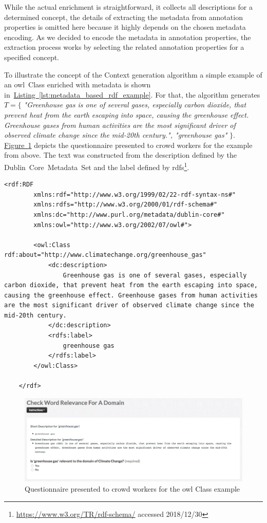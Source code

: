 While the actual enrichment is straightforward, it collects all descriptions for a determined concept, the details of extracting the metadata from annotation properties is omitted here because it highly depends on the chosen metadata encoding.
As we decided to encode the metadata in annotation properties, the extraction process works by selecting the related annotation properties for a specified concept. 

To illustrate the concept of the Context generation algorithm a simple example of an \gls{owl}~Class enriched with metadata is shown in~\hyperref[lst:metadata_based_rdf_example]{Listing~\ref*{lst:metadata_based_rdf_example}}.
For that, the algorithm generates $T=\{$ \emph{"Greenhouse gas is one of several gases, especially carbon dioxide, that prevent heat from the earth escaping into space, causing the greenhouse effect. Greenhouse gases from human activities are the most significant driver of observed climate change since the mid-20th century.", "greenhouse gas"} $\}$. 
\hyperref[fig:metadata_rdf_example_questionaire]{Figure~\ref*{fig:metadata_rdf_example_questionaire}} depicts the questionnaire presented to crowd workers for the example from above. The text was constructed from the description defined by the Dublin~Core~Metadata~Set and the label defined by \gls{rdfs}\footnote{\url{https://www.w3.org/TR/rdf-schema/} accessed 2018/12/30}. 

\begin{lstlisting}[frame=single,breaklines=true,postbreak=\mbox{\textcolor{black}{$\hookrightarrow$}\space},caption=An \gls{owl} Class enriched with metadata,label=lst:metadata_based_rdf_example]
	<rdf:RDF
		xmlns:rdf="http://www.w3.org/1999/02/22-rdf-syntax-ns#"
		xmlns:rdfs="http://www.w3.org/2000/01/rdf-schema#"
		xmlns:dc="http://www.purl.org/metadata/dublin-core#"
		xmlns:owl="http://www.w3.org/2002/07/owl#">
		
		<owl:Class rdf:about="http://www.climatechange.org/greenhouse_gas"
			<dc:description>
				Greenhouse gas is one of several gases, especially carbon dioxide, that prevent heat from the earth escaping into space, causing the greenhouse effect. Greenhouse gases from human activities are the most significant driver of observed climate change since the mid-20th century.
			</dc:description>
			<rdfs:label>
				greenhouse gas
			</rdfs:label>
		</owl:Class>
		
	</rdf>
\end{lstlisting}

\begin{figure}
	 \centering
	 \includegraphics[width=\textwidth]{screenshots/questionaire_metadata_example}
	 \caption{Questionnaire presented to crowd workers for the \gls{owl} Class example}\label{fig:metadata_rdf_example_questionaire}
\end{figure}
